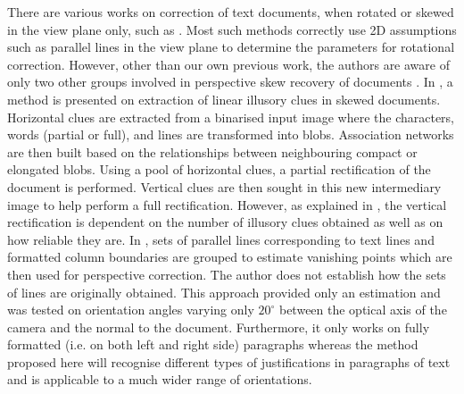 \documentclass{elsart}   %
\begin{document}
There are various works on correction of text documents, when rotated or skewed
in the view plane only, such as \cite{Yu96,Amin96,docsthrucams,messelod1}. 
Most such methods correctly use 2D assumptions such as parallel lines in the
view plane to determine the parameters for rotational correction. However, other
than our own previous work, the authors are aware of only two other groups
involved in perspective skew recovery of documents \cite{pilucvpr1,dance02}. In 
\cite{pilucvpr1}, a method is presented on extraction of linear illusory clues 
in skewed documents. Horizontal clues are extracted from a binarised input image
where the characters, words (partial or full), and lines are transformed into
blobs. Association networks are then built based on the relationships between
neighbouring compact or elongated blobs. Using a pool of horizontal clues, a
partial rectification of the document is performed.  Vertical clues are then
sought in this new intermediary image to help perform a full
rectification. However, as explained in \cite{pilucvpr1}, the vertical
rectification is dependent on the number of illusory clues obtained as well as
on how reliable they are. In \cite{dance02}, sets of parallel lines
corresponding to text lines and formatted column boundaries are grouped to
estimate vanishing points which are then used for perspective correction.  The
author does not establish how the sets of lines are originally obtained.  This
approach provided only an estimation and was tested on orientation angles
varying only $20^\circ$ between the optical axis of the camera and the normal to
the document. Furthermore, it only works on fully formatted (i.e. on both left
and right side) paragraphs whereas the method proposed here will recognise
different types of justifications in paragraphs of text and is applicable to a
much wider range of orientations. 

\end{document}
